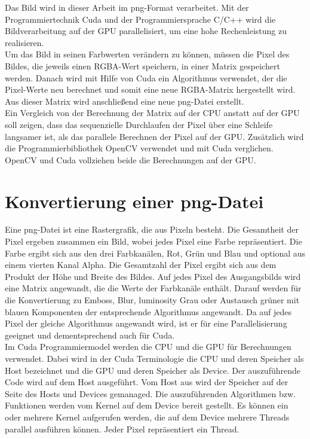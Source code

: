 \documentclass{llncs}
\begin{document}
Das Bild wird in dieser Arbeit im png-Format verarbeitet. Mit der Programmiertechnik Cuda und der Programmiersprache C/C++ wird die Bildverarbeitung auf der GPU parallelisiert, um eine hohe Rechenleistung zu realisieren.\\

Um das Bild in seinen Farbwerten verändern zu können, müssen die Pixel des Bildes, die jeweils einen RGBA-Wert speichern, in einer Matrix gespeichert werden. Danach wird mit Hilfe von Cuda ein Algorithmus verwendet, der die Pixel-Werte neu berechnet und somit eine neue RGBA-Matrix hergestellt wird. Aus dieser Matrix wird anschließend eine neue png-Datei erstellt.\\

Ein Vergleich von der Berechnung der Matrix auf der CPU anstatt auf der GPU soll zeigen, dass das sequenzielle Durchlaufen der Pixel über eine Schleife langsamer ist, als das parallele Berechnen der Pixel auf der GPU. Zusätzlich wird die Programmierbibliothek OpenCV verwendet und mit Cuda verglichen. OpenCV und Cuda vollziehen beide die Berechnungen auf der GPU.\\ 

%
\section{Konvertierung einer png-Datei}
%

Eine png-Datei ist eine Rastergrafik, die aus Pixeln besteht. Die Gesamtheit der Pixel ergeben zusammen ein Bild, wobei jedes Pixel eine Farbe repräsentiert. Die Farbe ergibt sich aus den drei Farbkanälen, Rot, Grün und Blau und optional aus einem vierten Kanal Alpha. Die Gesamtzahl der Pixel ergibt sich aus dem Produkt der Höhe und Breite des Bildes. Auf jedes Pixel des Ausgangsbilds wird eine Matrix angewandt, die die Werte der Farbkanäle enthält. Darauf werden für die Konvertierung zu Emboss, Blur, luminosity Grau oder Austausch grüner mit blauen Komponenten der entsprechende Algorithmus angewandt. Da auf jedes Pixel der gleiche Algorithmus angewandt wird, ist er für eine Parallelisierung geeignet und dementsprechend auch für Cuda.\\

Im Cuda Programmiermodel werden die CPU und die GPU für Berechnungen verwendet. Dabei wird in der Cuda Terminologie die CPU und deren Speicher als Host bezeichnet und die GPU und deren Speicher als Device. Der auszuführende Code wird auf dem Host ausgeführt. Vom Host aus wird der Speicher auf der Seite des Hosts und Devices gemanaged. Die auszuführenden Algorithmen bzw. Funktionen werden vom Kernel auf dem Device bereit gestellt. Es können ein oder mehrere Kernel aufgerufen werden, die auf dem Device mehrere Threads parallel ausführen können. Jeder Pixel repräsentiert ein Thread.\\
\end{document}

